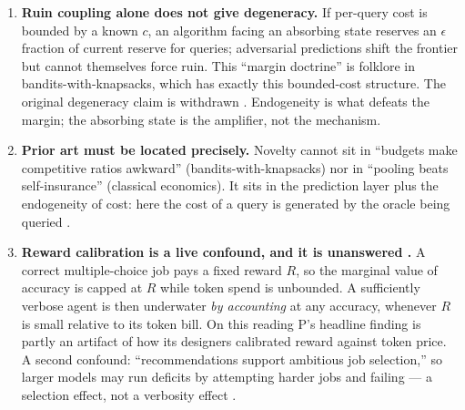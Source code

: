 \documentclass{article}
\begin{document}
\begin{enumerate}
  \item \textbf{Ruin coupling alone does not give degeneracy.} If per-query cost is
        bounded by a known \(c\), an algorithm facing an absorbing state reserves an
        \(\epsilon\) fraction of current reserve for queries; adversarial predictions shift
        the frontier but cannot themselves force ruin. This ``margin doctrine'' is folklore
        in bandits-with-knapsacks, which has exactly this bounded-cost structure. The
        original degeneracy claim  is withdrawn . Endogeneity is
        what defeats the margin; the absorbing state is the amplifier, not the mechanism.
  \item \textbf{Prior art must be located precisely.} Novelty cannot sit in ``budgets make
        competitive ratios awkward'' (bandits-with-knapsacks) nor in ``pooling beats
        self-insurance'' (classical economics). It sits in the prediction layer plus the
        endogeneity of cost: here the cost of a query is generated by the oracle being
        queried .
  \item \textbf{Reward calibration is a live confound, and it is unanswered
        .} A correct multiple-choice job pays a fixed reward \(R\), so
        the marginal value of accuracy is capped at \(R\) while token spend is unbounded. A
        sufficiently verbose agent is then underwater \emph{by accounting} at any accuracy,
        whenever \(R\) is small relative to its token bill. On this reading P's headline
        finding is partly an artifact of how its designers calibrated reward against token
        price. A second confound: ``recommendations support ambitious job selection,'' so
        larger models may run deficits by attempting harder jobs and failing --- a
        selection effect, not a verbosity effect .


\end{enumerate}
\end{document}
